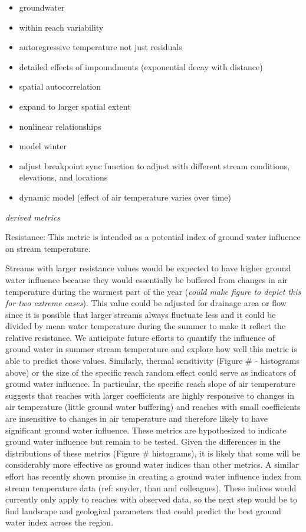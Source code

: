 \begin{itemize}
\itemsep1pt\parskip0pt
\item
  groundwater
\item
  within reach variability
\item
  autoregressive temperature not just residuals
\item
  detailed effects of impoundments (exponential decay with distance)
\item
  spatial autocorrelation
\item
  expand to larger spatial extent
\item
  nonlinear relationships
\item
  model winter
\item
  adjust breakpoint sync function to adjust with different stream
  conditions, elevations, and locations
\item
  dynamic model (effect of air temperature varies over time)
\end{itemize}

\emph{derived metrics}

Resistance: This metric is intended as a potential index of ground water
influence on stream temperature.

Streams with larger resistance values would be expected to have higher
ground water influence because they would essentially be buffered from
changes in air temperature during the warmest part of the year
(\emph{could make figure to depict this for two extreme cases}). This
value could be adjusted for drainage area or flow since it is possible
that larger streams always fluctuate less and it could be divided by
mean water temperature during the summer to make it reflect the relative
resistance. We anticipate future efforts to quantify the influence of
ground water in summer stream temperature and explore how well this
metric is able to predict those values. Similarly, thermal sensitivity
(Figure \# - histograms above) or the size of the specific reach random
effect could serve as indicators of ground water influence. In
particular, the specific reach slope of air temperature suggests that
reaches with larger coefficients are highly responsive to changes in air
temperature (little ground water buffering) and reaches with small
coefficients are insensitive to changes in air temperature and therefore
likely to have significant ground water influence. These metrics are
hypothesized to indicate ground water influence but remain to be tested.
Given the differences in the distributions of these metrics (Figure \#
histograms), it is likely that some will be considerably more effective
as ground water indices than other metrics. A similar effort has
recently shown promise in creating a ground water influence index from
stream temperature data (ref: snyder, than and colleagues). These
indices would currently only apply to reaches with observed data, so the
next step would be to find landscape and geological parameters that
could predict the best ground water index across the region.

